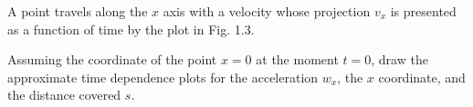 
\item A point travels along the \( x \) axis with a velocity whose projection \( v_x \) is presented as a function of time by the plot in Fig. 1.3.
    \begin{center}
    \end{center}
    Assuming the coordinate of the point \( x = 0 \) at the moment \( t = 0 \), draw the approximate time dependence plots for the acceleration \( w_x \), the \( x \) coordinate, and the distance covered \( s \).
